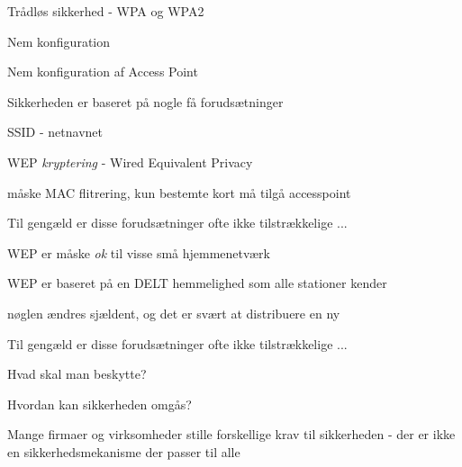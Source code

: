 \documentclass[Screen16to9,17pt]{foils}
\begin{document}
\begin{list2}
\item Trådløs sikkerhed - WPA og WPA2
\item Nem konfiguration
\item Nem konfiguration af Access Point
\end{list2}



\begin{list1}
\item Sikkerheden er baseret på nogle få forudsætninger
  \begin{list2}
  \item SSID - netnavnet
  \item WEP \emph{kryptering} - Wired Equivalent Privacy
  \item måske MAC flitrering, kun bestemte kort må tilgå accesspoint
  \end{list2}
\item Til gengæld er disse forudsætninger ofte ikke tilstrækkelige ...
  \begin{list2}
  \item WEP er måske \emph{ok} til visse små hjemmenetværk
  \item WEP er baseret på en DELT hemmelighed som alle stationer kender
  \item nøglen ændres sjældent, og det er svært at distribuere en ny
  \end{list2}

\end{list1}



\begin{list1}
\item Til gengæld er disse forudsætninger ofte ikke tilstrækkelige ...
\item Hvad skal man beskytte?
\item Hvordan kan sikkerheden omgås?
\item Mange firmaer og virksomheder stille forskellige krav til
  sikkerheden - der er ikke en sikkerhedsmekanisme der passer til alle
\end{list1}

\end{document}

